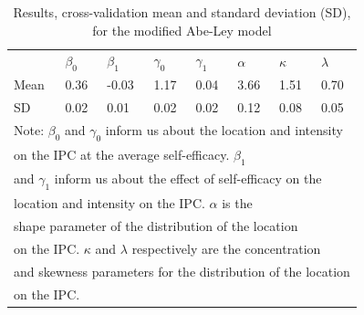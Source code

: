 \documentclass[man,mask]{apa6}
\begin{document}
\begin{table}
\begin{tabular}[t]{lllllll}
\end{tabular}
\end{table}

\begin{table}

\caption{\label{tab:estAL}Results, cross-validation mean and standard deviation (SD), for the modified Abe-Ley model}
\centering
\begin{tabular}[t]{llllllll}
\toprule
& $\beta_0$ & $\beta_1$ & $\gamma_0$  & $\gamma_1$ & $\alpha$ & $\kappa$ & $\lambda$\\
Mean & 0.36 & -0.03 & 1.17 & 0.04 & 3.66 & 1.51 & 0.70 \\
SD & 0.02 & 0.01 & 0.02 & 0.02 & 0.12 & 0.08 & 0.05\\
\bottomrule
\multicolumn{8}{l}{Note: $\beta_0$  and $\gamma_0$ inform us about the location and intensity }\\
\multicolumn{8}{l}{on the IPC at the average self-efficacy. $\beta_1$ }\\
\multicolumn{8}{l}{and $\gamma_1$ inform us about the effect of self-efficacy on the}\\
\multicolumn{8}{l}{location and intensity on the IPC. $\alpha$ is the } \\
\multicolumn{8}{l}{shape parameter of the distribution of the location }\\
\multicolumn{8}{l}{on the IPC. $\kappa$ and $\lambda$ respectively are the concentration}\\
\multicolumn{8}{l}{and skewness parameters for the distribution of the location}\\
\multicolumn{8}{l}{on the IPC.}\\
\end{tabular}
\end{table}
\end{document}
